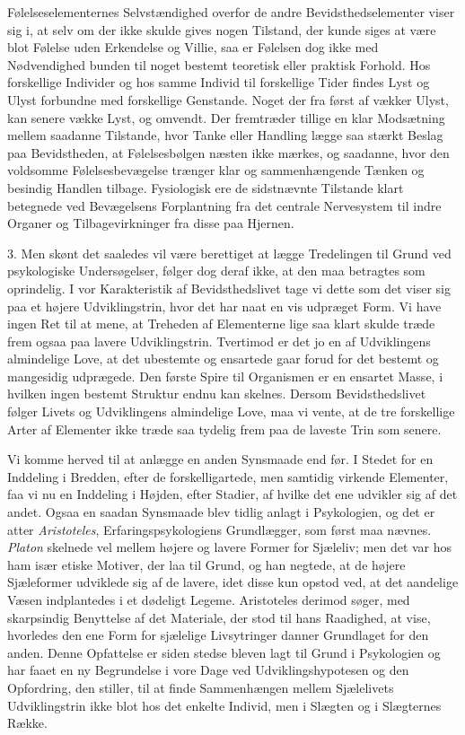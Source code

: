 \documentclass[12pt,a4paper,openany]{book}
\newcommand{\opage}[1]{\marginnote{\footnotesize\textit{[#1]}}}
\begin{document}
Følelseselementernes Selvstændighed overfor de andre
Bevidsthedselementer viser sig i, at selv om der ikke skulde gives nogen
Tilstand, der kunde siges at være blot Følelse uden Erkendelse og
Villie, saa er Følelsen dog ikke med Nødvendighed bunden til noget
bestemt teoretisk eller praktisk Forhold. Hos forskellige Individer og
hos samme Individ til forskellige Tider findes Lyst og Ulyst forbundne
med forskellige Genstande. Noget der fra først af vækker Ulyst, kan
senere vække Lyst, og omvendt. Der fremtræder tillige en klar Modsætning
mellem saadanne Tilstande, hvor Tanke eller Handling lægge saa stærkt
Beslag paa Bevidstheden, at Følelsesbølgen næsten ikke mærkes, og
saadanne, hvor den voldsomme Følelsesbevægelse trænger klar og
sammenhængende Tænken og besindig Handlen tilbage. Fysiologisk ere de
sidstnævnte Tilstande klart betegnede ved Bevægelsens Forplantning fra
det centrale Nervesystem til indre Organer og Tilbagevirkninger fra
disse paa Hjernen.

3. Men skønt det saaledes vil være berettiget at lægge Tredelingen til
Grund ved psykologiske Undersøgelser, følger dog deraf ikke, at den maa
betragtes som oprindelig. I vor Karakteristik af Bevidsthedslivet tage
vi dette som det viser sig paa et højere Udviklingstrin, hvor det har
naat en vis udpræget Form. Vi have ingen Ret til at mene, at Treheden af
Elementerne lige saa klart skulde træde frem ogsaa paa lavere
Udviklingstrin. Tvertimod er det jo en af Udviklingens almindelige Love,
at det ubestemte og ensartede gaar forud for det bestemt og mangesidig
udprægede. Den første Spire til Organismen er en ensartet Masse, i
hvilken ingen bestemt Struktur endnu kan skelnes. Dersom
Bevidsthedslivet følger Livets og Udviklingens almindelige Love, maa vi
vente, at de tre forskellige Arter af Elementer ikke træde saa tydelig
frem paa de laveste Trin som senere.


\opage{107}Vi komme herved til at anlægge en anden Synsmaade end før. I
Stedet for en Inddeling i Bredden, efter de forskelligartede, men
samtidig virkende Elementer, faa vi nu en Inddeling i Højden, efter
Stadier, af hvilke det ene udvikler sig af det andet. Ogsaa en saadan
Synsmaade blev tidlig anlagt i Psykologien, og det er atter
\emph{Aristoteles}, Erfaringspsykologiens Grundlægger, som først maa
nævnes. \emph{Platon} skelnede vel mellem højere og lavere Former for
Sjæleliv; men det var hos ham især etiske Motiver, der laa til Grund, og
han negtede, at de højere Sjæleformer udviklede sig af de lavere, idet
disse kun opstod ved, at det aandelige Væsen indplantedes i et dødeligt
Legeme. Aristoteles derimod søger, med skarpsindig Benyttelse af det
Materiale, der stod til hans Raadighed, at vise, hvorledes den ene Form
for sjælelige Livsytringer danner Grundlaget for den anden. Denne
Opfattelse er siden stedse bleven lagt til Grund i Psykologien og har
faaet en ny Begrundelse i vore Dage ved Udviklingshypotesen og den
Opfordring, den stiller, til at finde Sammenhængen mellem Sjælelivets
Udviklingstrin ikke blot hos det enkelte Individ, men i Slægten og i
Slægternes Række.
\end{document}
